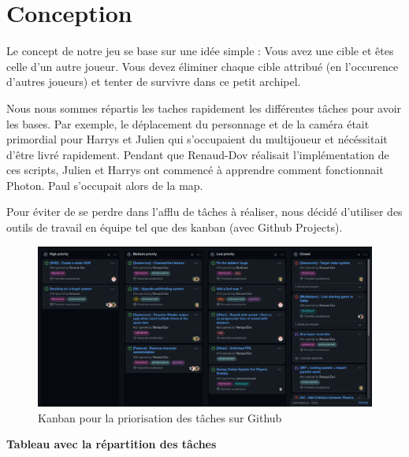 \documentclass[french, 12pt]{article}
\begin{document}

\section{Conception}

    Le concept de notre jeu se base sur une idée simple : Vous avez une cible et êtes celle d'un autre joueur.
    Vous devez éliminer chaque cible attribué (en l'occurence d'autres joueurs) et tenter de survivre dans ce petit archipel.

    Nous nous sommes répartis les taches rapidement les différentes tâches pour avoir les bases.
    Par exemple, le déplacement du personnage et de la caméra était primordial pour Harrys et Julien qui s'occupaient du multijoueur et nécéssitait d'être livré rapidement.
    Pendant que Renaud-Dov réalisait l'implémentation de ces scripts, Julien et Harrys ont commencé à apprendre comment fonctionnait Photon. Paul s'occupait alors de la map.

    Pour éviter de se perdre dans l'afflu de tâches à réaliser, nous décidé d'utiliser des outils de travail en équipe tel que des kanban (avec Github Projects).\\
    

    \begin{figure}[hbt!]
        \centering
        \includegraphics[scale=0.28]{kanban.png}
        \caption{Kanban pour la priorisation des tâches sur Github}
    \end{figure}


    \textbf{Tableau avec la répartition des tâches}

    
\end{document}

